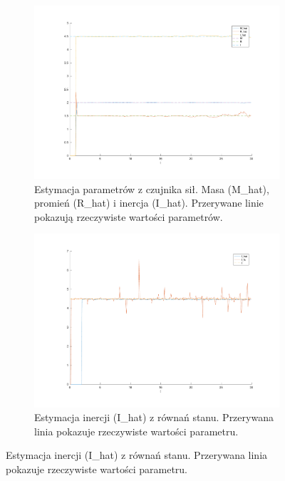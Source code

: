 \documentclass[a4paper, 10pt]{article}
\begin{document}
\begin{figure}
\begin{subfigure}{.5\textwidth}
		\includegraphics[width=\linewidth]{test_c}
		\caption{Estymacja parametrów z czujnika sił. Masa (M\_hat), promień (R\_hat) i inercja (I\_hat). Przerywane linie pokazują rzeczywiste wartości parametrów.}
		\label{fig:system_c}
	\end{subfigure}%
	\begin{subfigure}{.5\textwidth}
		\centering
		\includegraphics[width=\linewidth]{test_r}
		\caption{Estymacja inercji (I\_hat) z równań stanu. Przerywana linia pokazuje rzeczywiste wartości parametru.}
		\label{fig:system_r}
	\end{subfigure}
	

\end{figure}
\end{document}

